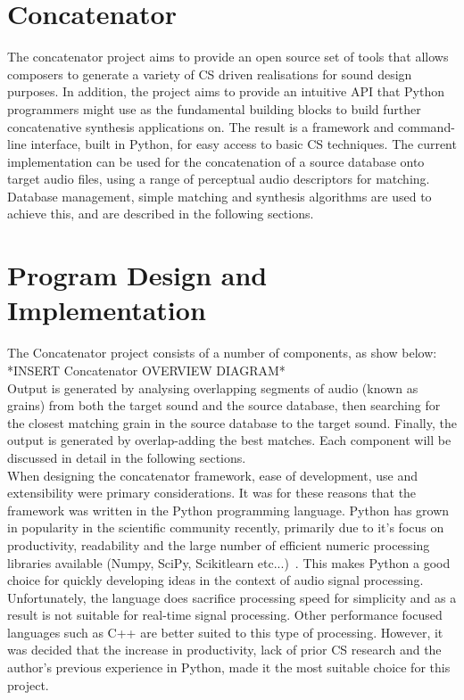\documentclass{scrartcl}
\begin{document}
    \section*{Concatenator}
    The concatenator project aims to provide an open source set of tools that
    allows composers to generate a variety of CS driven realisations for
    sound design purposes.  In addition, the project aims to provide an
    intuitive API that Python programmers might use as the fundamental building
    blocks to build further concatenative synthesis applications on.  
    The result is a framework and command-line interface, built in Python, for
    easy access to basic CS techniques.   
    The current implementation can be used for the concatenation of a source
    database onto target audio files, using a range of perceptual audio
    descriptors for matching. Database management, simple matching and
    synthesis algorithms are used to achieve this, and are described in the
    following sections.

    \section*{Program Design and Implementation}
    The Concatenator project consists of a number of components, as show below:\\

    *INSERT Concatenator OVERVIEW DIAGRAM*\\

    Output is generated by analysing overlapping segments of audio (known as
    grains) from both the target sound and the source database, then searching
    for the closest matching grain in the source database to the target sound.
    Finally, the output is generated by overlap-adding the best matches. Each
    component will be discussed in detail in the following sections.\\

    When designing the concatenator framework, ease of development, use and
    extensibility were primary considerations. It was for these reasons that
    the framework was written in the Python programming language. Python has
    grown in popularity in the scientific community recently, primarily due to
    it's focus on productivity, readability and the large number of efficient
    numeric processing libraries available (Numpy, SciPy, Scikitlearn
    etc...)~\parencite[p.11]{Fangohr2014}. This makes Python a good choice for
    quickly developing ideas in the context of audio signal processing.
    Unfortunately, the language does sacrifice processing speed for simplicity
    and as a result is not suitable for real-time signal processing. Other
    performance focused languages such as C++ are better suited to this type of
    processing. However, it was decided that the increase in productivity, lack
    of prior CS research and the author's previous experience in Python,
    made it the most suitable choice for this project.\\
\end{document}
